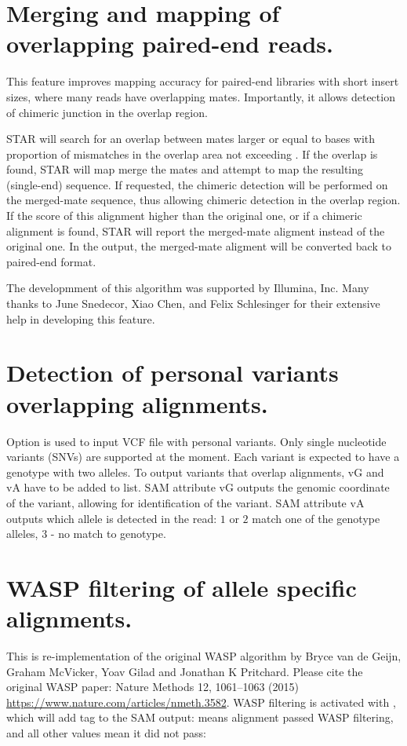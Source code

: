 \documentclass[12pt]{article}
\begin{document}
\section{Merging and mapping of overlapping paired-end reads.}
This feature improves mapping accuracy  for paired-end libraries with short insert sizes, where many reads have overlapping mates. Importantly, it allows detection of chimeric junction in the overlap region.

STAR will search for an overlap between mates larger or equal to  bases with proportion of mismatches in the overlap area not exceeding .
If the overlap is found, STAR will map merge the mates and attempt to map the resulting (single-end) sequence.
If requested, the chimeric detection will be performed on the merged-mate sequence, thus allowing chimeric detection in the overlap region.
If the score of this alignment higher than the original one, or if a chimeric alignment is found, STAR will report the merged-mate aligment instead of the original one.
In the output, the merged-mate aligment will be converted back to paired-end format.

The developmment of this algorithm was supported by Illumina, Inc.
Many thanks to June Snedecor, Xiao Chen, and Felix Schlesinger for their extensive help in developing this feature.

\section{Detection of personal variants overlapping alignments.}
Option   is used to input VCF file with personal variants. Only single nucleotide variants (SNVs) are supported at the moment.
Each variant is expected to have a genotype with two alleles.
To output variants that overlap alignments, vG and vA have to be added to  list.
SAM attribute vG outputs the genomic coordinate of the variant, allowing for identification of the variant.
SAM attribute vA outputs which allele is detected in the read: $1$ or $2$ match one of the genotype alleles, $3$ - no match to genotype.

\section{WASP filtering of allele specific alignments.} \label{section:WASP}
This is re-implementation of the original WASP algorithm by Bryce van de Geijn, Graham McVicker, Yoav Gilad and Jonathan K Pritchard. Please cite the original WASP paper: Nature Methods 12, 1061–1063 (2015) \url{https://www.nature.com/articles/nmeth.3582}.
WASP filtering is activated with  , which will add  tag to the SAM output:
 means alignment passed WASP filtering, and all other values mean it did not pass:
\end{document}
